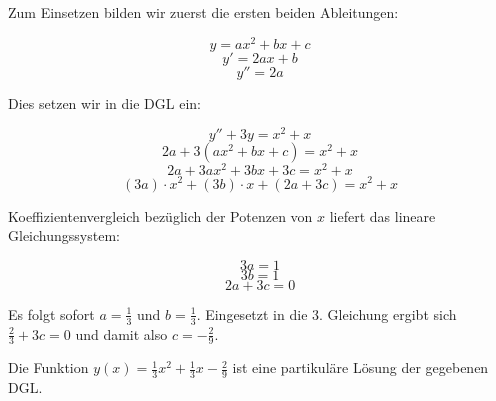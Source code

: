 \item Zum Einsetzen bilden wir zuerst die ersten beiden Ableitungen:

$$y=ax^2+bx+c$$
$$y'=2ax+b$$
$$y''=2a$$

Dies setzen wir in die DGL ein:

$$y''+3y=x^2+x$$
$$2a+3(ax^2+bx+c)=x^2+x$$
$$2a+3ax^2+3bx+3c=x^2+x$$
$$(3a)\cdot x^2+(3b)\cdot x+(2a+3c)=x^2+x$$

Koeffizientenvergleich bezüglich der Potenzen von $x$ liefert das lineare Gleichungssystem:

$$3a=1$$
$$3b=1$$
$$2a+3c=0$$

Es folgt sofort $a=\frac{1}{3}$ und $b=\frac{1}{3}$. Eingesetzt in die 3. Gleichung ergibt sich $\frac{2}{3}+3c=0$ und damit also $c=-\frac{2}{9}$.

Die Funktion $y(x) = \frac{1}{3}x^2+\frac{1}{3}x-\frac{2}{9}$ ist eine partikuläre Lösung der gegebenen DGL.
